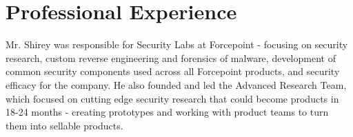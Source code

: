 \documentclass[11pt,a4paper,sans]{moderncv}
\begin{document}
\section{Professional Experience}
Mr. Shirey was responsible for Security Labs at Forcepoint - focusing on security research, custom reverse engineering and forensics of malware, development of common security components used across all Forcepoint products, and security efficacy for the company. He also founded and led the Advanced Research Team, which focused on cutting edge security research that could become products in 18-24 months - creating prototypes and working with product teams to turn them into sellable products.
\end{document}
